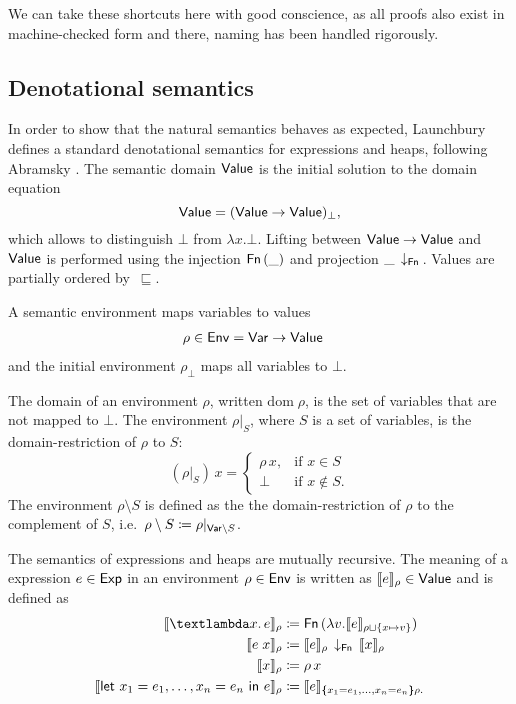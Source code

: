\documentclass[twopage]{scrartcl}
\theoremstyle{nonumberbreak}
\newcommand{\sVar}  {\text{\textsf{Var}}}
\newcommand{\sExp}  {\text{\textsf{Exp}}}
\newcommand{\sValue}{\text{\textsf{Value}}}
\newcommand{\sEnv}  {\text{\textsf{Env}}}
\newcommand{\sFn}[1]{\text{\textsf{Fn}}\,(#1)}
\newcommand{\sFnProj}[2]{#1\,\downarrow_{\text{\textsf{Fn}}}\,#2}
\newcommand{\sApp}[2]{#1\;#2}
\newcommand{\sLam}[2]{\text{\textlambda} #1.\, #2}
\newcommand{\sLet}[2]{\text{\textsf{let}}\ #1\ \text{\textsf{in}}\ #2}
\newcommand{\dom}[1]{\text{dom}\;#1}
\newcommand{\xeng}{x_1 = e_1, \ldots, x_n = e_n}
\newcommand{\dsem}[2]{\llbracket #1 \rrbracket_{#2}}
\newcommand{\esem}[1]{\{\!\!\!\{#1\}\!\!\!\}}
\newcommand{\shortcite}{\cite}
\begin{document}
We can take these shortcuts here with good conscience, as all proofs also exist in machine-checked form and there, naming has been handled rigorously.

\subsection{Denotational semantics}

In order to show that the natural semantics behaves as expected, Launchbury defines a standard denotational semantics for expressions and heaps, following Abramsky \shortcite{abramsky}. The semantic domain $\sValue$ is the initial solution to the domain equation 
\[
\sValue = (\sValue \to \sValue)_\bot,
\]
which allows to distinguish $\bot$ from $\lambda x. \bot$. Lifting between $\sValue \to \sValue$ and $\sValue$ is performed using the injection $\sFn \_$ and projection $\sFnProj{\_}{}$. Values are partially ordered by~$\sqsubseteq$.

A semantic environment maps variables to values
\begin{alignat*}{2}
\rho \in \sEnv &= \sVar \to \sValue
\end{alignat*}
and the initial environment $\rho_\bot$ maps all variables to $\bot$.

The domain of an environment $\rho$, written $\dom\rho$, is the set of variables that are not mapped to $\bot$.
The environment $\rho|_S$, where $S$ is a set of variables, is the domain-restriction of $\rho$ to $S$:
\[
(\rho |_S)\, x = 
\begin{cases}
\rho\, x,& \text{if } x \in S\\
\bot& \text{if } x \not\in S.
\end{cases}
\]
The environment $\rho\setminus S$ is defined as the the domain-restriction of $\rho$ to the complement of $S$, i.e.\ \mbox{$\rho\setminus S \coloneqq \rho|_{\sVar \setminus S}$}.

The semantics of expressions and heaps are mutually recursive. The meaning of a expression $e \in \sExp$ in an environment $\rho \in \sEnv$ is written as $\dsem e \rho \in \sValue$ and is defined as
\begin{align*}
\dsem{\sLam x e}\rho &\coloneqq \sFn{\lambda v. \dsem e {\rho \sqcup \{x \mapsto v\}}}\\
\dsem{\sApp e  x}\rho &\coloneqq \sFnProj {\dsem e \rho}{\dsem x \rho}\\
\dsem{x}\rho &\coloneqq \rho\,x\\
\dsem{\sLet{\xeng}e}\rho &\coloneqq \dsem e {\esem{\xeng}\rho.}
\end{align*}
\end{document}
